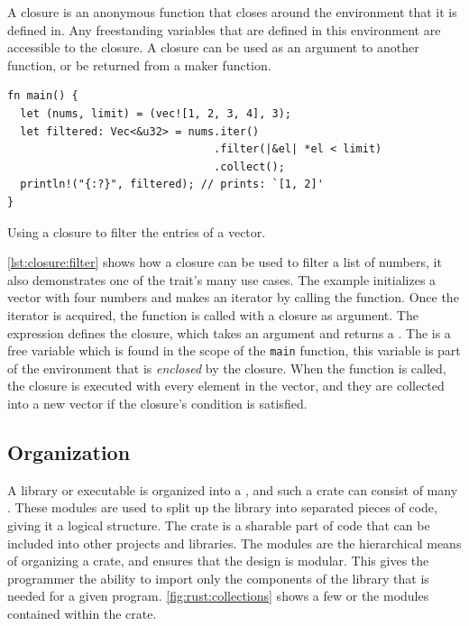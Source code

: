 A closure is an anonymous function that closes around the environment that it is defined in.
Any freestanding variables that are defined in this environment are accessible to the closure.
A closure can be used as an argument to another function, or be returned from a maker function.

\begin{listing}[H]
  \begin{verbatim}
fn main() {
  let (nums, limit) = (vec![1, 2, 3, 4], 3);
  let filtered: Vec<&u32> = nums.iter()
                                .filter(|&el| *el < limit)
                                .collect();
  println!("{:?}", filtered); // prints: `[1, 2]'
}
  \end{verbatim}
  \caption{Using a closure to filter the entries of a vector.}
  \label{lst:closure:filter}
\end{listing}

\autoref{lst:closure:filter} shows how a closure can be used to filter a list of numbers, it also demonstrates one of the  trait's many use cases.
The example initializes a vector with four numbers and makes an iterator by calling the  function.
Once the iterator is acquired, the  function is called with a closure as argument.
The expression  defines the closure, which takes an argument  and returns a .
The  is a free variable which is found in the scope of the \texttt{main} function, this variable is part of the environment that is \emph{enclosed} by the closure.
When the  function is called, the closure is executed with every element in the vector, and they are collected into a new vector if the closure's condition is satisfied.


\subsection{Organization}
\label{ssub:rust:organization}

A {\rust} library or executable is organized into a , and such a crate can consist of many .
These modules are used to split up the library into separated pieces of code, giving it a logical structure.
The crate is a sharable part of {\rust} code that can be included into other projects and libraries.
The modules are the hierarchical means of organizing a crate, and ensures that the design is modular.
This gives the programmer the ability to import only the components of the library that is needed for a given program.
\autoref{fig:rust:collections} shows a few or the modules contained within the {\rust}  crate.

